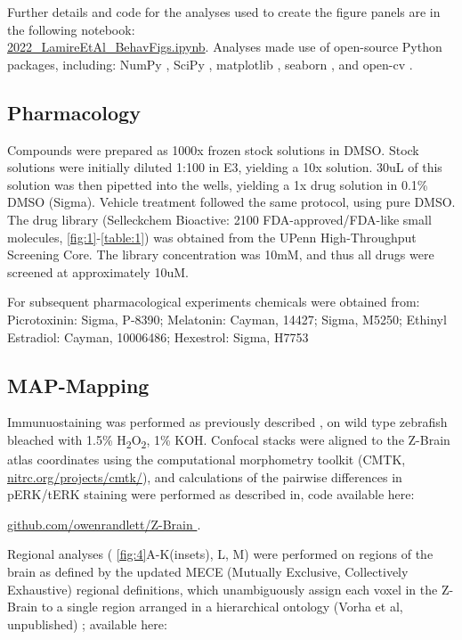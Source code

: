 \documentclass[9pt,lineno]{RandlettLab_elife}
\begin{document}
Further details and code for the analyses used to create the figure panels are in the following notebook:
\\ \href{https://nbviewer.org/github/owenrandlett/lamire_2022/blob/main/2022_LamireEtAl_BehavFigs.ipynb}{2022\_LamireEtAl\_BehavFigs.ipynb}. Analyses made use of open-source Python packages, including: NumPy \cite{Harris2020-bg}, SciPy \cite{Virtanen2020-sz}, matplotlib \cite{Hunter2007-ub}, seaborn \cite{Waskom2021-ah}, and open-cv \cite{Bradski2000-qo}.

\subsection{Pharmacology}

Compounds were prepared as 1000x frozen stock solutions in DMSO. Stock solutions were initially diluted 1:100 in E3, yielding a 10x solution. 30uL of this solution was then pipetted into the wells, yielding a 1x drug solution in 0.1\% DMSO (Sigma). Vehicle treatment followed the same protocol, using pure DMSO. The drug library (Selleckchem Bioactive: 2100 FDA-approved/FDA-like small molecules, \autoref{fig:1}-\autoref{table:1}) was obtained from the UPenn High-Throughput Screening Core. The library concentration was 10mM, and thus all drugs were screened at approximately 10uM. 

For subsequent pharmacological experiments chemicals were obtained from: Picrotoxinin: Sigma, P-8390; Melatonin: Cayman, 14427; Sigma, M5250; Ethinyl Estradiol: Cayman, 10006486; Hexestrol: Sigma, H7753

\subsection{MAP-Mapping}

Immunuostaining was performed as previously described \cite{Randlett2015-hy}, on wild type zebrafish bleached with 1.5\% H\textsubscript{2}O\textsubscript{2}, 1\% KOH. Confocal stacks were aligned to the Z-Brain atlas coordinates using the computational morphometry toolkit (CMTK, \href{//www.nitrc.org/projects/cmtk/}{nitrc.org/projects/cmtk/}), and calculations of the pairwise differences in pERK/tERK staining were performed as described in, code available here:

\href{https://github.com/owenrandlett/Z-Brain }{github.com/owenrandlett/Z-Brain }.  

Regional analyses ( \autoref{fig:4}A-K(insets), L, M) were performed on regions of the brain as defined by the updated MECE (Mutually Exclusive, Collectively Exhaustive) regional definitions, which unambiguously assign each voxel in the Z-Brain to a single region arranged in a hierarchical ontology (Vorha et al, unpublished) ; available here:
\end{document}
